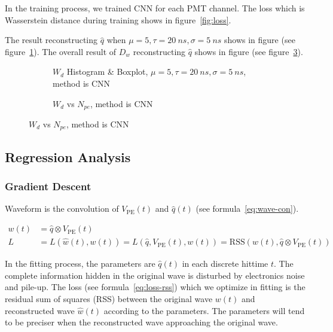 In the training process, we trained CNN for each PMT channel. The loss which is Wasserstein distance during training shows in figure~\ref{fig:loss}. 

The result reconstructing $\hat{q}$ when $\mu=5, \tau=\SI{20}{ns}, \sigma=\SI{5}{ns}$ shows in figure (see figure~\ref{fig:cnn-hist}). The overall result of $D_w$ reconstructing $\hat{q}$ shows in figure (see figure~\ref{fig:cnn-npe}). 

\begin{figure}[H]
\begin{minipage}[t]{.5\textwidth}
\begin{figure}[H]
    \centering
    \resizebox{\textwidth}{!}{}
    \caption{\label{fig:cnn-hist} $W_{d}$ Histogram \& Boxplot, $\mu=5, \tau=\SI{20}{ns}, \sigma=\SI{5}{ns}$, method is CNN}
\end{figure}
\end{minipage}
\begin{minipage}[t]{.5\textwidth}
\begin{figure}[H]
    \centering
    \resizebox{\textwidth}{!}{}
    \caption{\label{fig:cnn-npe} $W_{d}$ vs $N_{pe}$, method is CNN}
\end{figure}
\end{minipage}
\end{figure}

\subsection{Regression Analysis}
\subsubsection{Gradient Descent}

Waveform is the convolution of $V_\mathrm{PE}(t)$ and $\hat{q}(t)$ (see formula~\eqref{eq:wave-con}). 

\begin{align}
    w(t) &= \hat{q} \otimes V_\mathrm{PE}(t) \label{eq:wave-con} \\
    L &= L(\hat{w}(t), w(t)) = L(\hat{q}, V_\mathrm{PE}(t), w(t)) = \mathrm{RSS}(w(t), \hat{q} \otimes V_\mathrm{PE}(t)) \label{eq:loss-rss}
\end{align}

In the fitting process, the parameters are $\hat{q}(t)$ in each discrete hittime $t$. The complete information hidden in the original wave is disturbed by electronics noise and pile-up. The loss (see formula~\ref{eq:loss-rss}) which we optimize in fitting is the residual sum of squares (RSS) between the original wave $w(t)$ and reconstructed wave $\hat{w}(t)$ according to the parameters. The parameters will tend to be preciser when the reconstructed wave approaching the original wave. 

